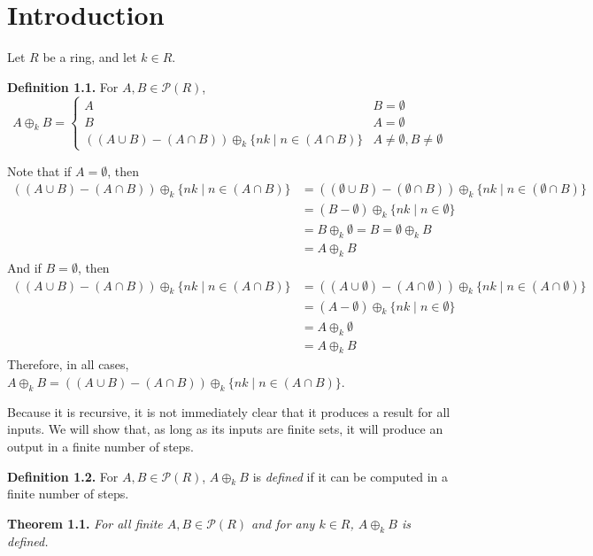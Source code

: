 \documentclass{article}
\begin{document}
\section{Introduction}

Let $R$ be a ring, and let $k \in R$.

\textbf{Definition 1.1.} For $A, B \in \mathcal{P}(R)$,
\[A \oplus_k B = \begin{cases}
    A & B = \emptyset \\
    B & A = \emptyset \\
    ((A \cup B) - (A \cap B)) \oplus_k \{nk \mid n \in (A \cap B)\}
        & A \neq \emptyset, B \neq \emptyset
\end{cases}\]

Note that if $A = \emptyset$, then
\[\begin{split}
    ((A \cup B) - (A \cap B)) \oplus_k \{nk \mid n \in (A \cap B)\}
    &= ((\emptyset \cup B) - (\emptyset \cap B))
        \oplus_k \{nk \mid n \in (\emptyset \cap B)\} \\
    &= (B - \emptyset) \oplus_k \{nk \mid n \in \emptyset\} \\
    &= B \oplus_k \emptyset = B = \emptyset \oplus_k B \\
    &= A \oplus_k B
\end{split}\]
And if $B = \emptyset$, then
\[\begin{split}
    ((A \cup B) - (A \cap B)) \oplus_k \{nk \mid n \in (A \cap B)\}
    &= ((A \cup \emptyset) - (A \cap \emptyset))
        \oplus_k \{nk \mid n \in (A \cap \emptyset)\} \\
    &= (A - \emptyset) \oplus_k \{nk \mid n \in \emptyset\} \\
    &= A \oplus_k \emptyset \\
    &= A \oplus_k B
\end{split}\]
Therefore, in all cases,
$A \oplus_k B
= ((A \cup B) - (A \cap B)) \oplus_k \{nk \mid n \in (A \cap B)\}$.

Because it is recursive, it is not immediately clear that it
produces a result for all inputs. We will show that, as long
as its inputs are finite sets, it will produce an output
in a finite number of steps.

\textbf{Definition 1.2.} For $A, B \in \mathcal{P}(R)$,
$A \oplus_k B$ is \textit{defined} if it can be computed in a finite
number of steps.

\textbf{Theorem 1.1.} \textit{
    For all finite $A, B \in \mathcal{P}(R)$
    and for any $k \in R$,
    $A \oplus_k B$ is defined.
}
\end{document}
